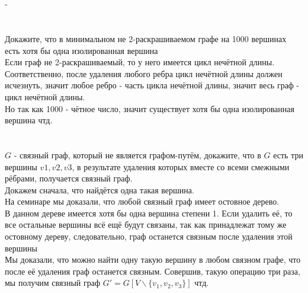 \documentclass{article}
\begin{document}
\section{}
-
\section{}
Докажите, что в минимальном не 2-раскрашиваемом графе на 1000 вершинах есть хотя бы одна изолированная вершина\\
Если граф не 2-раскрашиваемый, то у него имеется цикл нечётной длины.\\
Соответственно, после удаления любого ребра цикл нечётной длины должен исчезнуть, значит любое ребро - часть цикла нечётной длины, значит весь граф - цикл нечётной длины.\\
Но так как 1000 - чётное число, значит существует хотя бы одна изолированная вершина чтд.
\section{}
$G$ - связный граф, который не является графом-путём, докажите, что в $G$ есть три вершины $v1,v2,v3$, в результате удаления которых вместе со всеми смежными рёбрами, получается связный граф.\\
Докажем сначала, что найдётся одна такая вершина.\\
На семинаре мы доказали, что любой связный граф имеет остовное дерево.\\
В данном дереве имеется хотя бы одна вершина степени 1. Если удалить её, то все остальные вершины всё ещё будут связаны, так как принадлежат тому же остовному дереву, следовательно, граф останется связным после удаления этой вершины\\
Мы доказали, что можно найти одну такую вершину в любом связном графе, что после её удаления граф останется связным. Совершив, такую операцию три раза, мы получим связный граф $G' = G[V\backslash \{v_1, v_2, v_3\}]$ чтд.
\end{document}
